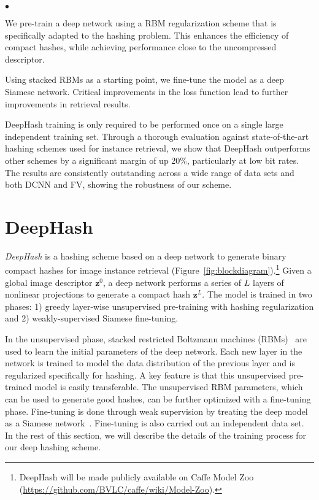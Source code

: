 \documentclass[10pt,twocolumn,letterpaper]{article}
\newcommand{\squishlist}{
 \begin{list}{$\bullet$}
  { \setlength{\itemsep}{0pt}
     \setlength{\parsep}{3pt}
     \setlength{\topsep}{3pt}
     \setlength{\partopsep}{0pt}
     \setlength{\leftmargin}{1.5em}
     \setlength{\labelwidth}{1em}
     \setlength{\labelsep}{0.5em}}}
\newcommand{\squishend}{
  \end{list}  }
\begin{document}
\squishlist
\item 
We pre-train a deep network using a RBM regularization scheme that is specifically adapted to the hashing problem. This enhances the efficiency of compact hashes, while achieving performance close to the uncompressed descriptor.

\item 
Using stacked RBMs as a starting point, we fine-tune the model as a deep Siamese network. 
Critical improvements in the loss function lead to further improvements in retrieval results.

\item 
DeepHash training is only required to be performed once on a single large independent training set. Through a thorough evaluation against state-of-the-art hashing schemes used for instance retrieval, we show that DeepHash outperforms other schemes by a significant margin of up 20$\%$, particularly at low bit rates. The results are consistently outstanding across a wide range of data sets and both DCNN and FV, showing the robustness of our scheme.
\squishend






















\section{DeepHash}
\label{sec:deepHash}


{\it DeepHash} is a hashing scheme based on a deep network to generate binary compact hashes for image instance retrieval (Figure~\ref{fig:blockdiagram}).\footnote{DeepHash will be made publicly available on Caffe Model Zoo~\cite{Caffe} (\url{https://github.com/BVLC/caffe/wiki/Model-Zoo}).} Given a global image descriptor $\mathbf{z}^0$, a deep network performs a series of $L$ layers of nonlinear projections to generate a compact hash $\mathbf{z}^{L}$. The model is trained in two phases: 1) greedy layer-wise unsupervised pre-training with hashing regularization and 2) weakly-supervised Siamese fine-tuning.

In the unsupervised phase, stacked restricted Boltzmann machines (RBMs)~\cite{HintonDBN} are used to learn the initial parameters of the deep network. Each new layer in the network is trained to model the data distribution of the previous layer and is regularized specifically for hashing. A key feature is that this unsupervised pre-trained model is easily transferable. The unsupervised RBM parameters, which can be used to generate good hashes, can be further optimized with a fine-tuning phase. 
Fine-tuning is done through weak supervision by treating the deep model as a Siamese network~\cite{siamesenetwork}. 
Fine-tuning is also carried out an independent data set.
In the rest of this section, we will describe the details of the training process for our deep hashing scheme.
\end{document}
